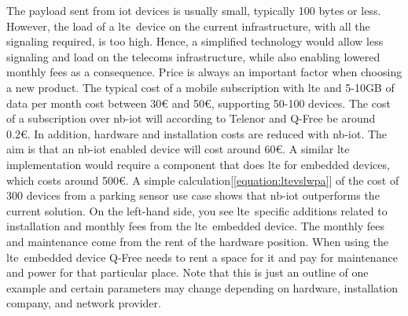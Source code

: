 \documentclass[USenglish]{ifimaster}  %
\begin{document}
The payload sent from \acrshort{iot} devices is usually small, typically 100 bytes or less. However, the load of a \acrshort{lte} device on the current infrastructure, with all the signaling required, is too high. Hence, a simplified technology would allow less signaling and load on the telecoms infrastructure, while also enabling lowered monthly fees as a consequence. Price is always an important factor when choosing a new product. The typical cost of a mobile subscription with \acrshort{lte} and 5-10GB of data per month cost between 30€ and 50€, supporting 50-100 devices. The cost of a subscription over \acrshort{nb-iot} will according to Telenor and Q-Free be around 0.2€. In addition, hardware and installation costs are reduced with \acrshort{nb-iot}. The aim is that an \acrshort{nb-iot} enabled device will cost around 60€. A similar \acrshort{lte} implementation would require a component that does \acrshort{lte} for embedded devices, which costs around 500€. A simple calculation[\ref{equation:ltevslwpa}] of the cost of 300 devices from a parking sensor use case shows that \acrshort{nb-iot} outperforms the current solution. On the left-hand side, you see \acrshort{lte} specific additions related to installation and monthly fees from the \acrshort{lte} embedded device. The monthly fees and maintenance come from the rent of the hardware position. When using the \acrshort{lte} embedded device Q-Free needs to rent a space for it and pay for maintenance and power for that particular place. Note that this is just an outline of one example and certain parameters may change depending on hardware, installation company, and network provider.
\end{document}
